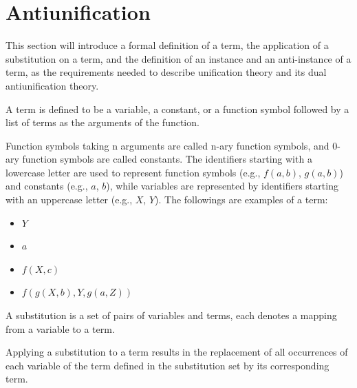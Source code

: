 \section{Antiunification}   \label{AU}



This section will introduce a formal definition of a term, the application of a substitution on a term, and the definition of an instance and an anti-instance of a term, as the requirements needed  to describe unification theory and its dual antiunification theory.

\begin{defn}[Term]\label{def:term}
A term is defined to be a variable, a constant, or a function symbol followed by a list of terms as the arguments of the function.
\end{defn}

Function symbols taking n arguments are called n-ary function symbols, and 0-ary function symbols are called constants. The identifiers starting with a lowercase letter are used to represent function symbols (e.g., $f(a,b)$, $g(a,b)$) and constants (e.g., $a$, $b$), while variables are represented by identifiers starting with an uppercase letter (e.g., $X$, $Y$). The followings are examples of a term:
\begin{itemize} [leftmargin=0.7in]
\item $Y$
\item $a$
\item $f(X, c)$
\item $f(g(X, b),Y, g(a, Z))$
\end{itemize}
\begin{defn}[ substitution]\label{def:substitution}
A substitution is a set of pairs of variables and terms, each denotes a mapping from a variable to a term. 
\end{defn}

\begin{defn}\label{def:substitution}
Applying a substitution to a term results in the replacement of all occurrences of each variable of the term defined in the substitution set by its corresponding term.
\end{defn}

